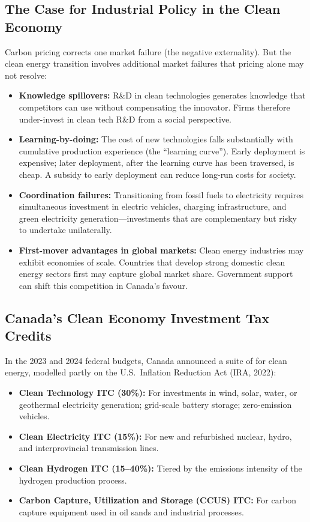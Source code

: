 \subsection{The Case for Industrial Policy in the Clean Economy}

Carbon pricing corrects one market failure (the negative externality). But the clean energy transition involves additional market failures that pricing alone may not resolve:

\begin{itemize}
  \item \textbf{Knowledge spillovers:} R\&D in clean technologies generates knowledge that competitors can use without compensating the innovator. Firms therefore under-invest in clean tech R\&D from a social perspective.
  \item \textbf{Learning-by-doing:} The cost of new technologies falls substantially with cumulative production experience (the ``learning curve''). Early deployment is expensive; later deployment, after the learning curve has been traversed, is cheap. A subsidy to early deployment can reduce long-run costs for society.
  \item \textbf{Coordination failures:} Transitioning from fossil fuels to electricity requires simultaneous investment in electric vehicles, charging infrastructure, and green electricity generation---investments that are complementary but risky to undertake unilaterally.
  \item \textbf{First-mover advantages in global markets:} Clean energy industries may exhibit economies of scale. Countries that develop strong domestic clean energy sectors first may capture global market share. Government support can shift this competition in Canada's favour.
\end{itemize}

\subsection{Canada's Clean Economy Investment Tax Credits}

In the 2023 and 2024 federal budgets, Canada announced a suite of  for clean energy, modelled partly on the U.S.\ Inflation Reduction Act (IRA, 2022):

\begin{itemize}
  \item \textbf{Clean Technology ITC (30\%):} For investments in wind, solar, water, or geothermal electricity generation; grid-scale battery storage; zero-emission vehicles.
  \item \textbf{Clean Electricity ITC (15\%):} For new and refurbished nuclear, hydro, and interprovincial transmission lines.
  \item \textbf{Clean Hydrogen ITC (15--40\%):} Tiered by the emissions intensity of the hydrogen production process.
  \item \textbf{Carbon Capture, Utilization and Storage (CCUS) ITC:} For carbon capture equipment used in oil sands and industrial processes.
\end{itemize}

